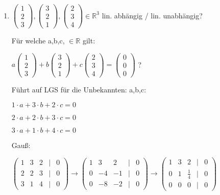 \documentclass[a4paper, openany]{book}
\begin{document}
\begin{enumerate}[label=(\alph*)]
      \item $\begin{pmatrix}1 \\ 2 \\ 3 \end{pmatrix}, \begin{pmatrix}3 \\ 2 \\ 1 \end{pmatrix}, \begin{pmatrix}2 \\ 3 \\ 4 \end{pmatrix} \in \mathbb{R}^3$ lin. abhängig / lin. unabhängig?

      Für welche a,b,c, $\in \mathbb{R}$ gilt:

      $a \begin{pmatrix}1 \\ 2 \\ 3 \end{pmatrix} + b \begin{pmatrix}3 \\ 2 \\ 1 \end{pmatrix} + c \begin{pmatrix} 2 \\ 3 \\4 \end{pmatrix} = \begin{pmatrix}0 \\ 0 \\ 0 \end{pmatrix}$ ?

      Führt auf LGS für die Unbekannten: a,b,c:

      $1 \cdot a + 3 \cdot b + 2 \cdot c = 0$ 

      $2 \cdot a + 2 \cdot b + 3 \cdot c = 0$ 

      $3 \cdot a + 1 \cdot b + 4 \cdot c = 0$

      Gauß:

      $\begin{pmatrix}1 & 3 & 2 & | & 0 \\ 2 & 2 & 3 & | & 0 \\ 3 & 1 & 4 & | & 0 \end{pmatrix} \rightarrow \begin{pmatrix} 1 & 3 & 2 & | & 0 \\ 0 & -4 & -1 & | & 0 \\ 0 & -8 & -2 & | & 0 \end{pmatrix} \rightarrow \begin{pmatrix}1 & 3 & 2 & | & 0 \\ 0 & 1 & \frac{1}{4} & | & 0 \\ 0 & 0 & 0 & | & 0 \end{pmatrix} $


\end{enumerate}
\end{document}
